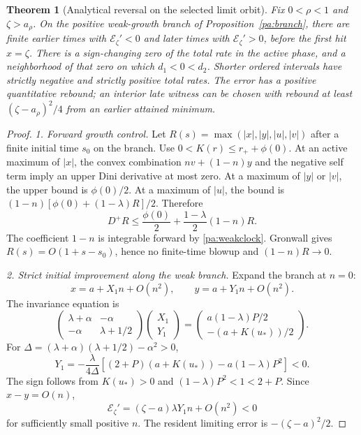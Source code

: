 \documentclass[11pt]{article}
\numberwithin{equation}{section}
\newtheorem{theorem}[proposition]{Theorem}
\theoremstyle{definition}
\theoremstyle{remark}
\newcommand{\1}{\mathbf 1}
\begin{document}
\begin{theorem}[Analytical reversal on the selected limit orbit]\label{pa:limitreversal}
Fix $0<\rho<1$ and $\zeta>a_\rho$. On the positive weak-growth branch of
Proposition~\ref{pa:branch}, there are finite earlier times with
$\mathcal E_\zeta'<0$ and later times with $\mathcal E_\zeta'>0$, before
the first hit $x=\zeta$. There is a sign-changing zero of the total rate
in the active phase, and a neighborhood of that zero on which
$d_1<0<d_2$. Shorter ordered intervals have strictly negative and strictly
positive total rates. The error has a positive quantitative rebound; an
interior late witness can be chosen with rebound at least
$(\zeta-a_\rho)^2/4$ from an earlier attained minimum.
\end{theorem}
\begin{proof}
\emph{1. Forward growth control.}
Let $R(s)=\max(|x|,|y|,|u|,|v|)$ after a finite initial time $s_0$ on the
branch. Use $0<K(r)\le r_++\phi(0)$. At an active maximum of $|x|$, the
convex combination $nv+(1-n)y$ and the negative self term imply an upper
Dini derivative at most zero. At a maximum of $|y|$ or $|v|$, the upper
bound is $\phi(0)/2$. At a maximum of $|u|$, the bound is
$(1-n)[\phi(0)+(1-\lambda)R]/2$. Therefore
\[
 D^+R\le\frac{\phi(0)}2+\frac{1-\lambda}{2}(1-n)R.
\]
The coefficient $1-n$ is integrable forward by \eqref{pa:weakclock}.
Gronwall gives $R(s)=O(1+s-s_0)$, hence no finite-time blowup and
$(1-n)R\to0$.

\emph{2. Strict initial improvement along the weak branch.}
Expand the branch at $n=0$:
\[
 x=a+X_1n+O(n^2),\qquad y=a+Y_1n+O(n^2).
\]
The invariance equation is
\[
 \begin{pmatrix}\lambda+\alpha&-\alpha\\-\alpha&\lambda+1/2\end{pmatrix}
 \begin{pmatrix}X_1\\Y_1\end{pmatrix}
 =\begin{pmatrix}a(1-\lambda)P/2\\-(a+K(u_*))/2\end{pmatrix}.
\]
For $\Delta=(\lambda+\alpha)(\lambda+1/2)-\alpha^2>0$,
\[
 Y_1=-\frac{\lambda}{4\Delta}
 [(2+P)(a+K(u_*))-a(1-\lambda)P^2]<0.
\]
The sign follows from $K(u_*)>0$ and $(1-\lambda)P^2<1<2+P$.
Since $x-y=O(n)$,
\[
 \mathcal E_\zeta'=(\zeta-a)\lambda Y_1n+O(n^2)<0
\]
for sufficiently small positive $n$. The resident limiting error is
$-(\zeta-a)^2/2$.


\end{proof}
\end{document}
